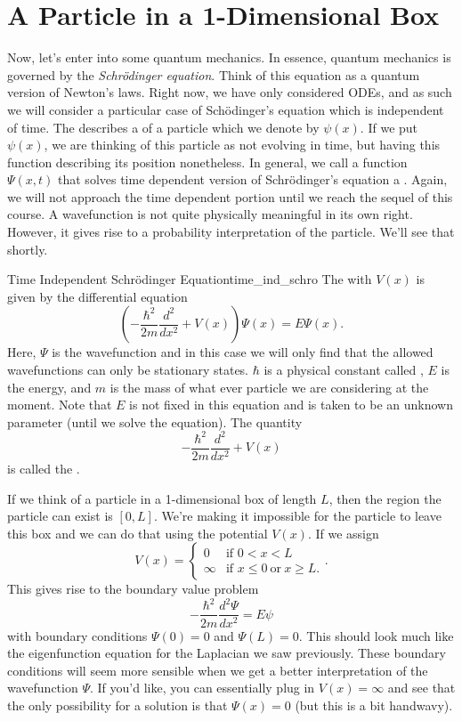 \section{A Particle in a 1-Dimensional Box}

Now, let's enter into some quantum mechanics.  In essence, quantum mechanics is governed by the \emph{Schr\"odinger equation}.  Think of this equation as a quantum version of Newton's laws.  Right now, we have only considered ODEs, and as such we will consider a particular case of Sch\"odinger's equation which is independent of time. The  describes a  of a particle which we denote by $\psi(x)$.  If we put $\psi(x)$, we are thinking of this particle as not evolving in time, but having this function describing its position nonetheless.  In general, we call a function $\Psi(x,t)$ that solves time dependent version of Schr\"odinger's equation a . Again, we will not approach the time dependent portion until we reach the sequel of this course.  A wavefunction is not quite physically meaningful in its own right.  However, it gives rise to a probability interpretation of the particle. We'll see that shortly.

\begin{df}{Time Independent Schr\"odinger Equation}{time_ind_schro}
The  with  $V(x)$ is given by the differential equation
\[
\left(-\frac{\hbar^2}{2m}\frac{d^2}{dx^2}+V(x)\right)\Psi(x)=E\Psi(x).
\]
Here, $\Psi$ is the wavefunction and in this case we will only find that the allowed wavefunctions can only be stationary states. $\hbar$ is a physical constant called , $E$ is the energy, and $m$ is the mass of what ever particle we are considering at the moment. Note that $E$ is not fixed in this equation and is taken to be an unknown parameter (until we solve the equation). The quantity
\[
-\frac{\hbar^2}{2m}\frac{d^2}{dx^2}+V(x)
\]
is called the .
\end{df}

If we think of a particle in a 1-dimensional box of length $L$, then the region the particle can exist is $[0,L]$.  We're making it impossible for the particle to leave this box and we can do that using the potential $V(x)$. If we assign
\[
V(x)=\begin{cases} 0 & \textrm{if } 0<x<L\\
\infty & \textrm{if } x\leq 0 ~\textrm{or}~ x\geq L. \end{cases}.
\]
This gives rise to the boundary value problem
\[
-\frac{\hbar^2}{2m}\frac{d^2\Psi}{dx^2}=E\psi
\]
with boundary conditions $\Psi(0)=0$ and $\Psi(L)=0$. This should look much like the eigenfunction equation for the Laplacian we saw previously. These boundary conditions will seem more sensible when we get a better interpretation of the wavefunction $\Psi$. If you'd like, you can essentially plug in $V(x)=\infty$ and see that the only possibility for a solution is that $\Psi(x)=0$ (but this is a bit handwavy). 

